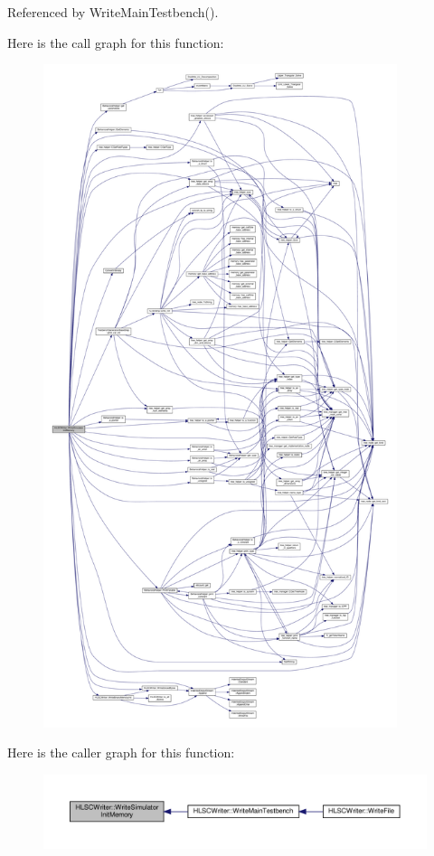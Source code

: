 Referenced by Write\+Main\+Testbench().

Here is the call graph for this function\+:
\nopagebreak
\begin{figure}[H]
\begin{center}
\leavevmode
\includegraphics[height=550pt]{d4/db1/classHLSCWriter_ae0fce69eece5d49b74c5d615f169f17b_cgraph}
\end{center}
\end{figure}
Here is the caller graph for this function\+:
\nopagebreak
\begin{figure}[H]
\begin{center}
\leavevmode
\includegraphics[width=350pt]{d4/db1/classHLSCWriter_ae0fce69eece5d49b74c5d615f169f17b_icgraph}
\end{center}
\end{figure}
\mbox{\label{classHLSCWriter_a65f826c5a0e6536a762985601e621250}} 
